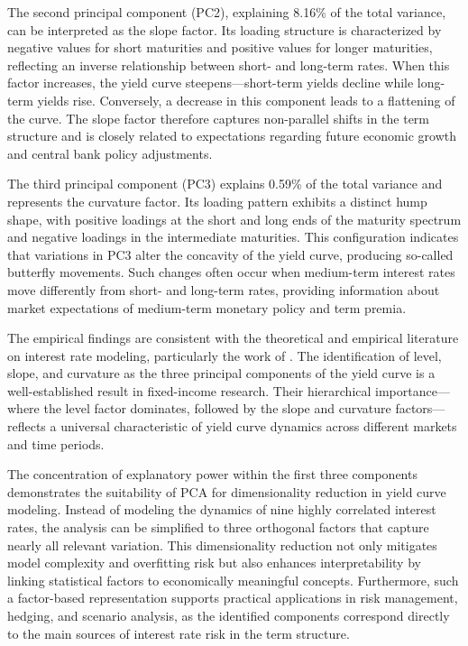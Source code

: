 The second principal component (PC2), explaining 8.16\% of the total variance, can be interpreted as the slope factor. Its loading structure is characterized by negative values for short maturities and positive values for longer maturities, reflecting an inverse relationship between short- and long-term rates. When this factor increases, the yield curve steepens—short-term yields decline while long-term yields rise. Conversely, a decrease in this component leads to a flattening of the curve. The slope factor therefore captures non-parallel shifts in the term structure and is closely related to expectations regarding future economic growth and central bank policy adjustments.

The third principal component (PC3) explains 0.59\% of the total variance and represents the curvature factor. Its loading pattern exhibits a distinct hump shape, with positive loadings at the short and long ends of the maturity spectrum and negative loadings in the intermediate maturities. This configuration indicates that variations in PC3 alter the concavity of the yield curve, producing so-called butterfly movements. Such changes often occur when medium-term interest rates move differently from short- and long-term rates, providing information about market expectations of medium-term monetary policy and term premia.

The empirical findings are consistent with the theoretical and empirical literature on interest rate modeling, particularly the work of \parencite[pp.~98--107]{Rebonato_2018}. The identification of level, slope, and curvature as the three principal components of the yield curve is a well-established result in fixed-income research. Their hierarchical importance—where the level factor dominates, followed by the slope and curvature factors—reflects a universal characteristic of yield curve dynamics across different markets and time periods.

The concentration of explanatory power within the first three components demonstrates the suitability of PCA for dimensionality reduction in yield curve modeling. Instead of modeling the dynamics of nine highly correlated interest rates, the analysis can be simplified to three orthogonal factors that capture nearly all relevant variation. This dimensionality reduction not only mitigates model complexity and overfitting risk but also enhances interpretability by linking statistical factors to economically meaningful concepts. Furthermore, such a factor-based representation supports practical applications in risk management, hedging, and scenario analysis, as the identified components correspond directly to the main sources of interest rate risk in the term structure.

